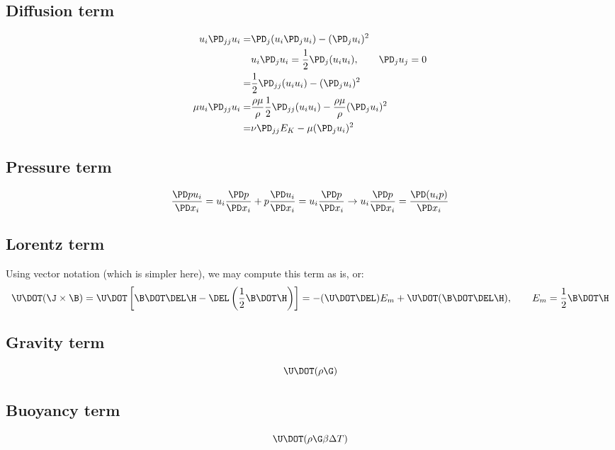 \documentclass[11pt]{article}
\begin{document}
\subsection{Diffusion term}
\begin{equation}\begin{aligned}
	u_i \PD_{jj} u_i     = & \PD_j (u_i \PD_j u_i ) - (\PD_j u_i)^2  \\
	                       & u_i \PD_j u_i = \frac{1}{2} \PD_j (u_i u_i), \qquad \PD_j u_j = 0 \\
	                     = & \frac{1}{2} \PD_{jj} (u_i u_i) - (\PD_j u_i)^2 \\
	\mu u_i \PD_{jj} u_i = & \frac{\rho \mu}{\rho} \frac{1}{2} \PD_{jj} (u_i u_i) - \frac{\rho \mu}{\rho} (\PD_j u_i)^2 \\
	                     = & \nu \PD_{jj} E_K - \mu (\PD_j u_i)^2 \\
\end{aligned}\end{equation}

\subsection{Pressure term}
\begin{equation}
	\frac{\PD p u_i}{\PD x_i}
	= u_i \frac{\PD p}{\PD x_i}
	+ p \frac{\PD u_i}{\PD x_i}
	= u_i \frac{\PD p}{\PD x_i}
	\rightarrow
	u_i \frac{\PD p}{\PD x_i} =
	\frac{\PD (u_i p)}{\PD x_i}
\end{equation}

\subsection{Lorentz term}
Using vector notation (which is simpler here), we may compute this term as is, or:
\begin{equation}
	\U \DOT (\J \times \B) = 
	\U \DOT \left[\B \DOT \DEL \H -\DEL \left( \frac{1}{2} \B \DOT \H \right)\right] = 
	- (\U \DOT \DEL) E_m
	+ \U \DOT (\B \DOT \DEL \H)
	,\qquad
	E_m = \frac{1}{2} \B \DOT \H
\end{equation}

\subsection{Gravity term}
\begin{equation}
	\U \DOT (\rho \G)
\end{equation}
\subsection{Buoyancy term}
\begin{equation}
	\U \DOT (\rho \G \beta \Delta T)
\end{equation}
\end{document}
